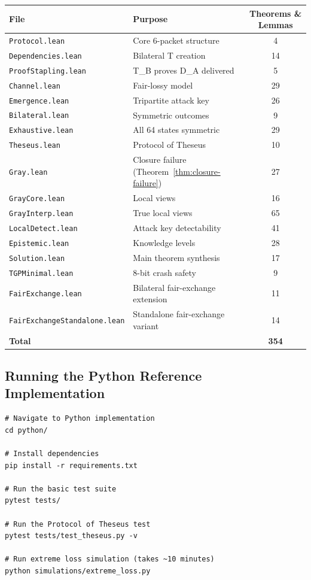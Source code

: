 \begin{center}
\begin{tabular}{llc}
\toprule
\textbf{File} & \textbf{Purpose} & \textbf{Theorems \& Lemmas} \\
\midrule
\texttt{Protocol.lean} & Core 6-packet structure & 4 \\
\texttt{Dependencies.lean} & Bilateral T creation & 14 \\
\texttt{ProofStapling.lean} & T\_B proves D\_A delivered & 5 \\
\texttt{Channel.lean} & Fair-lossy model & 29 \\
\texttt{Emergence.lean} & Tripartite attack key & 26 \\
\texttt{Bilateral.lean} & Symmetric outcomes & 9 \\
\texttt{Exhaustive.lean} & All 64 states symmetric & 29 \\
\texttt{Theseus.lean} & Protocol of Theseus & 10 \\
\texttt{Gray.lean} & Closure failure (Theorem~\ref{thm:closure-failure}) & 27 \\
\texttt{GrayCore.lean} & Local views & 16 \\
\texttt{GrayInterp.lean} & True local views & 65 \\
\texttt{LocalDetect.lean} & Attack key detectability & 41 \\
\texttt{Epistemic.lean} & Knowledge levels & 28 \\
\texttt{Solution.lean} & Main theorem synthesis & 17 \\
\texttt{TGPMinimal.lean} & 8-bit crash safety & 9 \\
\texttt{FairExchange.lean} & Bilateral fair-exchange extension & 11 \\
\texttt{FairExchangeStandalone.lean} & Standalone fair-exchange variant & 14 \\
\midrule
\textbf{Total} & & \textbf{354} \\
\bottomrule
\end{tabular}
\end{center}

\subsection{Running the Python Reference Implementation}

\begin{verbatim}
# Navigate to Python implementation
cd python/

# Install dependencies
pip install -r requirements.txt

# Run the basic test suite
pytest tests/

# Run the Protocol of Theseus test
pytest tests/test_theseus.py -v

# Run extreme loss simulation (takes ~10 minutes)
python simulations/extreme_loss.py
\end{verbatim}

